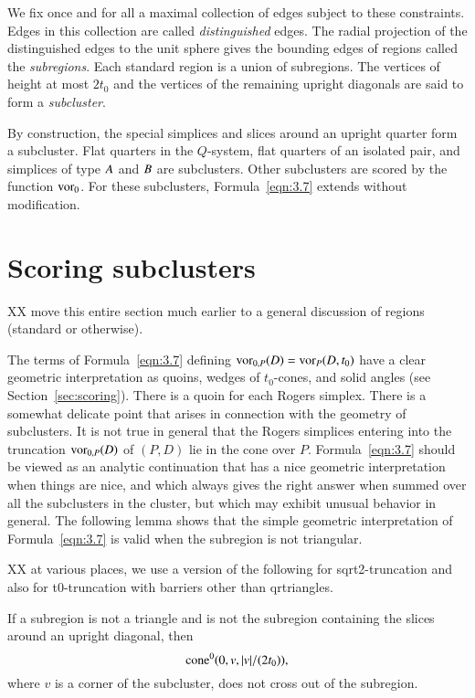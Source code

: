 We fix once and for all a maximal collection of edges subject to
these constraints. Edges in this collection are called {\it
distinguished\/} edges. The radial projection of the distinguished
edges to the unit sphere gives the bounding edges of regions
called the {\it subregions}.  Each standard region is a union of
subregions. The vertices of height at most $2t_0$ and the vertices
of the remaining upright diagonals are said to form a {\it
subcluster}.


By construction, the special simplices and slices
around an upright quarter form a subcluster.  Flat quarters in the
$Q$-system, flat quarters of an isolated pair, and simplices of
type $A$ and $B$ are subclusters.  Other subclusters are
scored by the function $\operatorname{vor}_0$. For these subclusters,
Formula~\ref{eqn:3.7} extends without modification.

\section{Scoring subclusters} %

XX move this entire section much earlier to a general discussion
of regions (standard or otherwise).

The terms of Formula~\ref{eqn:3.7} defining
$\operatorname{vor}_{0,P}(D)=\operatorname{vor}_P(D,t_0)$ have a clear geometric
interpretation as quoins, wedges of $t_0$-cones, and solid angles
(see Section~\ref{sec:scoring}). There is a quoin for each Rogers
simplex. There is a somewhat delicate point that arises in
connection with the geometry of subclusters.  It is not true in
general that the Rogers simplices entering into the truncation
$\operatorname{vor}_{0,P}(D)$ of $(P,D)$ lie in the cone over $P$.
Formula~\ref{eqn:3.7} should be viewed as an analytic continuation
that has a nice geometric interpretation when things are nice, and
which always gives the right answer when summed over all the
subclusters in the cluster, but which may exhibit unusual behavior
in general. The following lemma shows that the simple geometric
interpretation of Formula~\ref{eqn:3.7} is valid when the
subregion is not triangular.

XX at various places, we use a version of the following 
for sqrt2-truncation
and also for t0-truncation with barriers other than qrtriangles.


\begin{lemma}
    \label{lemma:no-cross}
If a subregion is not a triangle and is not  the subregion
containing the slices around an upright diagonal, then
   $${\operatorname{cone}}^0(0,v,|v|/(2t_0)),$$
where $v$ is a corner of the subcluster,
does not cross out of the subregion.
\end{lemma}

